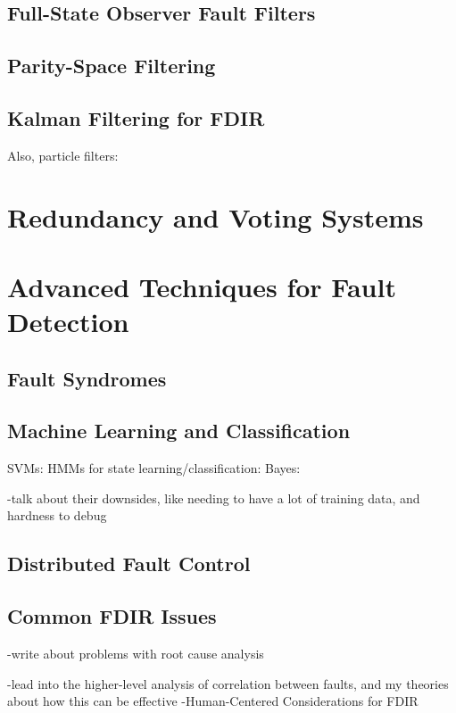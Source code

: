 \subsection{Full-State Observer Fault Filters}


\subsection{Parity-Space Filtering}


\subsection{Kalman Filtering for FDIR}

\cite{larson2002model}
\cite{washington2000board}

Also, particle filters:

\cite{dearden2004real}

\section{Redundancy and Voting Systems}


\section{Advanced Techniques for Fault Detection}

\subsection{Fault Syndromes}

\cite{hammett1991application}


\subsection{Machine Learning and Classification}

SVMs: \cite{lin2006fault}
HMMs for state learning/classification: \cite{aycard2000state}
Bayes: \cite{holsti2001towards} \cite{paakko2001bayesian}

-talk about their downsides, like needing to have a lot of training data, and hardness to debug

\subsection{Distributed Fault Control}

\cite{castel2006fdir}


\subsection{Common FDIR Issues}

\cite{kurien2010intrinsic}

-write about problems with root cause analysis

-lead into the higher-level analysis of correlation between faults, and my theories about how this can be effective
-Human-Centered Considerations for FDIR